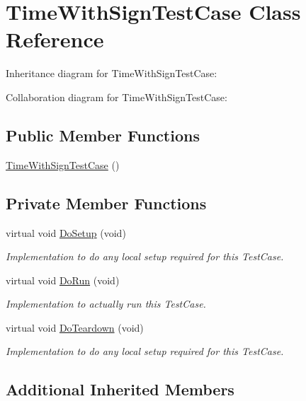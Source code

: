 \hypertarget{classTimeWithSignTestCase}{}\section{Time\+With\+Sign\+Test\+Case Class Reference}
\label{classTimeWithSignTestCase}


Inheritance diagram for Time\+With\+Sign\+Test\+Case\+:


Collaboration diagram for Time\+With\+Sign\+Test\+Case\+:
\subsection*{Public Member Functions}
\begin{DoxyCompactItemize}
\item 
\hyperlink{classTimeWithSignTestCase_ad845180ee37a2614d8efc4063bc24c46}{Time\+With\+Sign\+Test\+Case} ()
\end{DoxyCompactItemize}
\subsection*{Private Member Functions}
\begin{DoxyCompactItemize}
\item 
virtual void \hyperlink{classTimeWithSignTestCase_a92113f60c40c550956d3b48db54ca2ad}{Do\+Setup} (void)
\begin{DoxyCompactList}\small\item\em Implementation to do any local setup required for this Test\+Case. \end{DoxyCompactList}\item 
virtual void \hyperlink{classTimeWithSignTestCase_a03309451e3cb122b3f7dec63070549b2}{Do\+Run} (void)
\begin{DoxyCompactList}\small\item\em Implementation to actually run this Test\+Case. \end{DoxyCompactList}\item 
virtual void \hyperlink{classTimeWithSignTestCase_a8a497c01f092408e85d9d0da0b98d00b}{Do\+Teardown} (void)
\begin{DoxyCompactList}\small\item\em Implementation to do any local setup required for this Test\+Case. \end{DoxyCompactList}\end{DoxyCompactItemize}
\subsection*{Additional Inherited Members}


